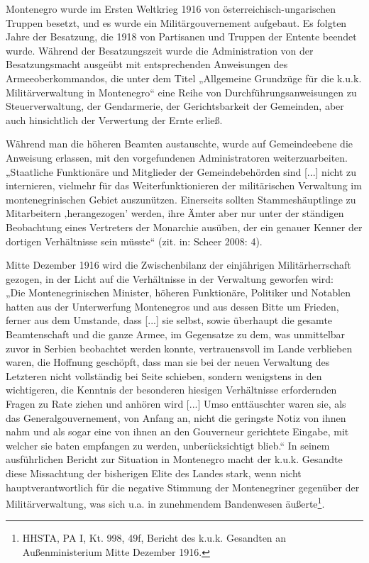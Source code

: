 Montenegro wurde im Ersten Weltkrieg 1916 von österreichisch-ungarischen Truppen besetzt, und es wurde ein Militärgouvernement aufgebaut. Es folgten Jahre der Besatzung, die 1918 von Partisanen und Truppen der Entente beendet wurde. Während der Besatzungszeit wurde die Administration von der Besatzungsmacht ausgeübt mit entsprechenden Anweisungen des Armeeoberkommandos, die unter dem Titel „Allgemeine Grundzüge für die k.u.k. Militärverwaltung in Montenegro“ eine Reihe von Durchführungsanweisungen zu Steuerverwaltung, der Gendarmerie, der Gerichtsbarkeit der Gemeinden, aber auch hinsichtlich der Verwertung der Ernte erließ.\par
Während man die höheren Beamten austauschte, wurde auf Gemeindeebene die Anweisung erlassen, mit den vorgefundenen Administratoren weiterzuarbeiten. „Staatliche Funktionäre und Mitglieder der Gemeindebehörden sind [...] nicht zu internieren, vielmehr für das Weiterfunktionieren der militärischen Verwaltung im montenegrinischen Gebiet auszunützen. Einerseits sollten Stammeshäuptlinge zu Mitarbeitern ‚herangezogen’ werden, ihre Ämter aber nur unter der ständigen Beobachtung eines Vertreters der Monarchie ausüben, der ein genauer Kenner der dortigen Verhältnisse sein müsste“ (zit. in: Scheer 2008: 4).\par
Mitte Dezember 1916 wird die Zwischenbilanz der einjährigen Militärherrschaft gezogen, in der Licht auf die Verhältnisse in der Verwaltung geworfen wird:\\
„Die Montenegrinischen Minister, höheren Funktionäre, Politiker und Notablen hatten aus der Unterwerfung Montenegros und aus dessen Bitte um Frieden, ferner aus dem Umstande, dass [...] sie selbst, sowie überhaupt die gesamte Beamtenschaft und die ganze Armee, im Gegensatze zu dem, was unmittelbar zuvor in Serbien beobachtet werden konnte, vertrauensvoll im Lande verblieben waren, die Hoffnung geschöpft, dass man sie bei der neuen Verwaltung des Letzteren nicht vollständig bei Seite schieben, sondern wenigstens in den wichtigeren, die Kenntnis der besonderen hiesigen Verhältnisse erfordernden Fragen zu Rate ziehen und anhören wird [...] Umso enttäuschter waren sie, als das Generalgouvernement, von Anfang an, nicht die geringste Notiz von ihnen nahm und als sogar eine von ihnen an den Gouverneur gerichtete Eingabe, mit welcher sie baten empfangen zu werden, unberücksichtigt blieb.“ In seinem ausführlichen Bericht zur Situation in Montenegro macht der k.u.k. Gesandte diese Missachtung der bisherigen Elite des Landes stark, wenn nicht hauptverantwortlich für die negative Stimmung der Montenegriner gegenüber der Militärverwaltung, was sich u.a. in zunehmendem Bandenwesen äußerte\footnote{HHSTA, PA I, Kt. 998, 49f, Bericht des k.u.k. Gesandten an Außenministerium Mitte Dezember 1916.}.\par

